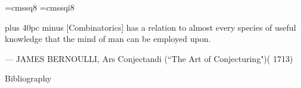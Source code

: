 \documentclass[aspectratio=169]{beamer}
\begin{document}
\font\eightss=cmssq8
\font\eightssi=cmssqi8
\newcommand\quoteAuthorDate[3]{\begingroup
  \baselineskip 10pt
  \parfillskip 0pt
  \interlinepenalty 10000 %
  \leftskip 0pt plus 40pc minus \parindent
  \let\rm=\eightss
  \let\sl=\eightssi
  \everypar{\sl}#1\par
  \nobreak\smallskip
  \noindent\rm--- #2\unskip\enspace(#3)\par
  \endgroup}
\begin{frame}
    \begin{center}
        \item \quoteAuthorDate{[Combinatorics] has a relation to almost every species of useful knowledge that the mind of man can be employed upon.}{JAMES BERNOULLI, Ars Conjectandi (``The Art of Conjecturing")}{\color{sigma@mainblue} 1713}
    \end{center}
\end{frame}

\begin{frame}{Bibliography}
    
    
\end{frame}
\end{document}
